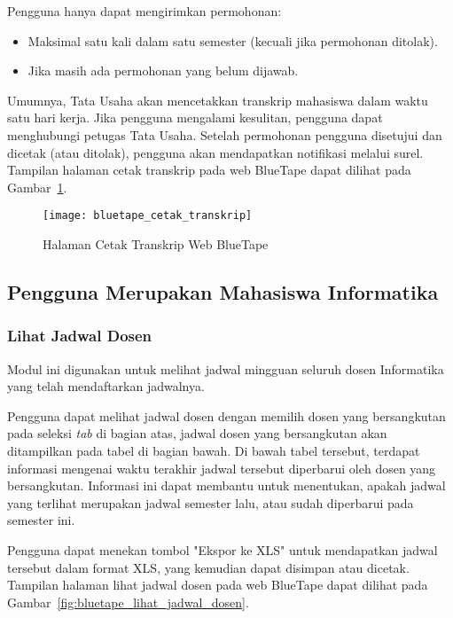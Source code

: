 Pengguna hanya dapat mengirimkan permohonan:
\begin{itemize}
	\item Maksimal satu kali dalam satu semester (kecuali jika permohonan ditolak).
	\item Jika masih ada permohonan yang belum dijawab.
\end{itemize}

Umumnya, Tata Usaha akan mencetakkan transkrip mahasiswa dalam waktu satu hari kerja. Jika pengguna mengalami kesulitan, pengguna dapat menghubungi petugas Tata Usaha. Setelah permohonan pengguna disetujui dan dicetak (atau ditolak), pengguna akan mendapatkan notifikasi melalui surel. Tampilan halaman cetak transkrip pada web BlueTape dapat dilihat pada \mbox{Gambar \ref{fig:bluetape_cetak_transkrip}}.

\begin{figure}[H]
    \centering  
    \texttt{[image: bluetape\_cetak\_transkrip]}
    \caption[Halaman Cetak Transkrip Web BlueTape]{Halaman Cetak Transkrip Web BlueTape}
    \label{fig:bluetape_cetak_transkrip}
\end{figure}

\subsection{Pengguna Merupakan Mahasiswa Informatika}
\label{sec:bluetape_mahasiswa_informatika}

\subsubsection{Lihat Jadwal Dosen}
\label{sec:bluetape_lihat_jadwal_dosen}

Modul ini digunakan untuk melihat jadwal mingguan seluruh dosen Informatika yang telah mendaftarkan jadwalnya.

Pengguna dapat melihat jadwal dosen dengan memilih dosen yang bersangkutan pada seleksi \textit{tab} di bagian atas, jadwal dosen yang bersangkutan akan ditampilkan pada tabel di bagian bawah. Di bawah tabel tersebut, terdapat informasi mengenai waktu terakhir jadwal tersebut diperbarui oleh dosen yang bersangkutan. Informasi ini dapat membantu untuk menentukan, apakah jadwal yang terlihat merupakan jadwal semester lalu, atau sudah diperbarui pada semester ini.

Pengguna dapat menekan tombol "Ekspor ke XLS" untuk mendapatkan jadwal tersebut dalam format XLS, yang kemudian dapat disimpan atau dicetak. Tampilan halaman lihat jadwal dosen pada web BlueTape dapat dilihat pada \mbox{Gambar \ref{fig:bluetape_lihat_jadwal_dosen}}.

